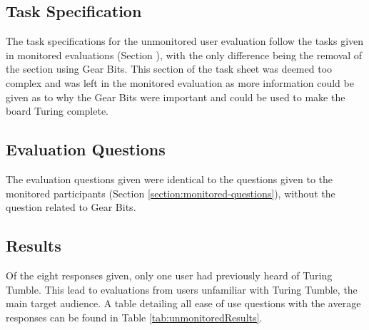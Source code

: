 \documentclass{l4proj}
\begin{document}
\subsection{Task Specification}
The task specifications for the unmonitored user evaluation follow the tasks given in monitored evaluations (Section ), with the only difference being the removal of the section using Gear Bits. This section of the task sheet was deemed too complex and was left in the monitored evaluation as more information could be given as to why the Gear Bits were important and could be used to make the board Turing complete. 

\subsection{Evaluation Questions}
The evaluation questions given were identical to the questions given to the monitored participants (Section \ref{section:monitored-questions}), without the question related to Gear Bits.   

\subsection{Results}
Of the eight responses given, only one user had previously heard of Turing Tumble. This lead to evaluations from users unfamiliar with Turing Tumble, the main target audience. A table detailing all ease of use questions with the average responses can be found in Table \ref{tab:unmonitoredResults}. 
\end{document}
